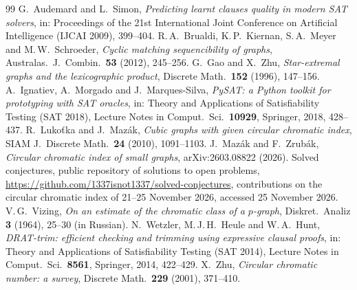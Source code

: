 \documentclass[11pt,colorlinks]{charlie}
\begin{document}
\begin{thebibliography}{99}\small
{} G.~Audemard and L.~Simon, \emph{Predicting learnt clauses quality in modern SAT solvers}, in: Proceedings of the 21st International Joint Conference on Artificial Intelligence (IJCAI 2009), 399--404.
 R.\,A.~Brualdi, K.\,P.~Kiernan, S.\,A.~Meyer and M.\,W.~Schroeder, \emph{Cyclic matching sequencibility of graphs}, Australas.\ J.\ Combin.\ \textbf{53} (2012), 245--256.
 G.~Gao and X.~Zhu, \emph{Star-extremal graphs and the lexicographic product}, Discrete Math.\ \textbf{152} (1996), 147--156.
 A.~Ignatiev, A.~Morgado and J.~Marques-Silva, \emph{PySAT: a Python toolkit for prototyping with SAT oracles}, in: Theory and Applications of Satisfiability Testing (SAT 2018), Lecture Notes in Comput.\ Sci.\ \textbf{10929}, Springer, 2018, 428--437.
 R.~Lukoťka and J.~Mazák, \emph{Cubic graphs with given circular chromatic index}, SIAM J.\ Discrete Math.\ \textbf{24} (2010), 1091--1103.
 J.~Mazák and F.~Zrubák, \emph{Circular chromatic index of small graphs}, arXiv:2603.08822 (2026).
 Solved conjectures, public repository of solutions to open problems, \url{https://github.com/1337isnot1337/solved-conjectures}, contributions on the circular chromatic index of 21--25 November 2026, accessed 25 November 2026.
 V.\,G.~Vizing, \emph{On an estimate of the chromatic class of a $p$-graph}, Diskret.\ Analiz \textbf{3} (1964), 25--30 (in Russian).
 N.~Wetzler, M.\,J.\,H.~Heule and W.\,A.~Hunt, \emph{DRAT-trim: efficient checking and trimming using expressive clausal proofs}, in: Theory and Applications of Satisfiability Testing (SAT 2014), Lecture Notes in Comput.\ Sci.\ \textbf{8561}, Springer, 2014, 422--429.
 X.~Zhu, \emph{Circular chromatic number: a survey}, Discrete Math.\ \textbf{229} (2001), 371--410.
\end{thebibliography}
\end{document}

